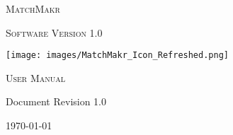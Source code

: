 \begin{titlepage}
	\centering
	\vspace{1in}
	{\scshape\Huge MatchMakr \par}
	{\scshape\Large Software Version 1.0 \par}
	\vspace{1in}
	\texttt{[image: images/MatchMakr\_Icon\_Refreshed.png]}\par
	\vspace{1in}
	{\scshape\LARGE User Manual\par}
	{Document Revision 1.0\par}
	{\large \today}
\end{titlepage}